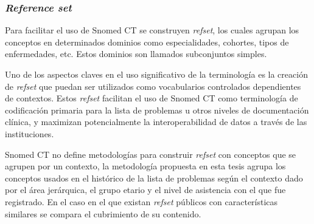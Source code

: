 \begin{table}[htb]
\centering
\caption{Jerarquías de la lista de problemas y frecuencias de uso}
\label{jerarquiasLista}
\end{table}

\subsubsection{\textit{Reference set}}
Para facilitar el uso de Snomed CT se construyen \textit{\acrfull{refset}}, los cuales agrupan los conceptos en determinados dominios como especialidades, cohortes, tipos de enfermedades, etc. Estos dominios son llamados subconjuntos simples.

Uno de los aspectos claves en el uso significativo de la terminología es la creación de \textit{\acrshort{refset}} que puedan ser utilizados como vocabularios controlados dependientes de contextos. Estos \textit{\acrshort{refset}} facilitan el uso de Snomed CT como terminología de codificación primaria para la lista de problemas u otros niveles de documentación clínica, y maximizan potencialmente la interoperabilidad de datos a través de las instituciones\cite{Dolin2004KaiserTerminology.}.

Snomed CT no define metodologías para construir \textit{\acrshort{refset}} con conceptos que se agrupen por un contexto, la metodología propuesta en esta tesis agrupa los conceptos usados en el histórico de la lista de problemas según el contexto dado por el área jerárquica, el grupo etario y el nivel de asistencia con el que fue registrado. En el caso en el que existan \textit{\acrshort{refset}} públicos con características similares se compara el cubrimiento de su  contenido.

